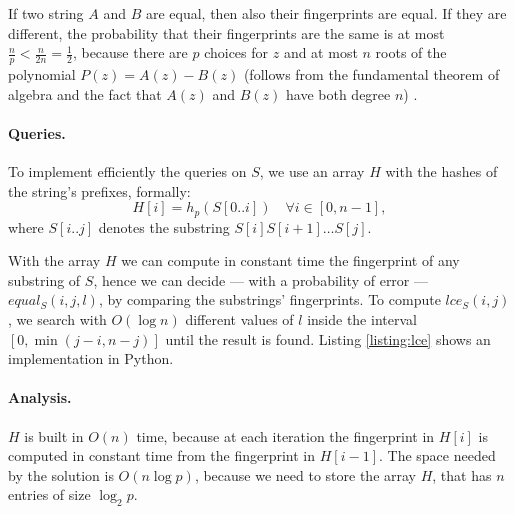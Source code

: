If two string $A$ and $B$ are equal, then also their fingerprints are equal. If they are different, the probability that their fingerprints are the same is at most $\frac{n}{p}<\frac{n}{2n}=\frac{1}{2}$, because there are $p$ choices for $z$ and at most $n$ roots of the polynomial $P(z)=A(z)-B(z)$ (follows from the  fundamental theorem of algebra and the fact that $A(z)$ and $B(z)$ have both degree $n$) \cite[169]{Motwani10}.

\paragraph{Queries.} To implement efficiently the queries on $S$, we use an array $H$ with the hashes of the string's prefixes, formally: 
$$H[i]=h_p(S[0..i]) \quad \forall i \in [0, n-1],$$
where $S[i..j]$ denotes the substring $S[i]S[i+1] \dots S[j]$.

With the array $H$ we can compute in constant time the fingerprint of any substring of $S$, hence we can decide --- with a probability of error --- $equal_S(i,j,l)$, by comparing the substrings' fingerprints. To compute $lce_S(i,j)$, we search with $O(\log n)$ different values of $l$ inside the interval $[0, \min(j-i,n-j)]$ until the result is found. Listing \ref{listing:lce} shows an implementation in Python.

\paragraph{Analysis.} $H$ is built in $O(n)$ time, because at each iteration the fingerprint in $H[i]$ is computed in constant time from the fingerprint in $H[i-1]$. The space needed by the solution is $O(n \log p)$, because we need to store the array $H$, that has $n$ entries of size $\log_2 p$. 

